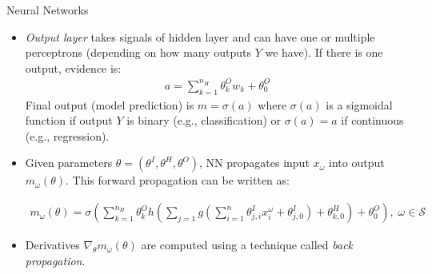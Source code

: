 \documentclass[9pt]{beamer}
\begin{document}
\begin{frame}{Neural Networks}
\begin{itemize}
   \setlength{\itemsep}{5pt}
\item {\em Output layer} takes signals of hidden layer and can have one or multiple perceptrons (depending on how many outputs $Y$ we have). If there is one output,  evidence is:
\begin{align*}
a=\sum_{k=1}^{n_H}\theta_{k}^{O}w_k+\theta_{0}^O
\end{align*}
Final output (model prediction) is $m=\sigma(a)$ where $\sigma(a)$ is a sigmoidal function if output $Y$ is binary (e.g., classification) or $\sigma(a)=a$ if continuous (e.g., regression). 

\item Given parameters $\theta=(\theta^I,\theta^H,\theta^O)$, NN propagates input $x_\omega$ into output $m_{\omega}(\theta)$. This forward propagation can be written as:
\begin{block}{}
\begin{align*}
m_{\omega}(\theta)
=\sigma\left(\sum_{k=1}^{n_H}\theta_{k}^Oh\left(\sum_{j=1}g\left(\sum_{i=1}^n\theta_{j,i}^Ix_i^\omega+\theta_{j,0}^I\right)+\theta_{k,0}^H\right)+\theta_0^O\right),\; \omega \in \mathcal{S}
\end{align*}
\end{block}
\item Derivatives $\nabla_\theta m_\omega(\theta)$ are computed using a technique called {\em back propagation}.
\end{itemize}

\end{frame}

\end{document}
